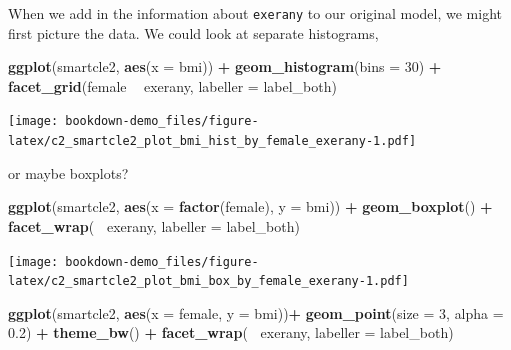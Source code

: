 \documentclass[]{book}
\newenvironment{Shaded}{\begin{snugshade}}{\end{snugshade}}
\newcommand{\KeywordTok}[1]{\textcolor[rgb]{0.13,0.29,0.53}{\textbf{#1}}}
\newcommand{\DataTypeTok}[1]{\textcolor[rgb]{0.13,0.29,0.53}{#1}}
\newcommand{\DecValTok}[1]{\textcolor[rgb]{0.00,0.00,0.81}{#1}}
\newcommand{\FloatTok}[1]{\textcolor[rgb]{0.00,0.00,0.81}{#1}}
\newcommand{\StringTok}[1]{\textcolor[rgb]{0.31,0.60,0.02}{#1}}
\newcommand{\OperatorTok}[1]{\textcolor[rgb]{0.81,0.36,0.00}{\textbf{#1}}}
\newcommand{\NormalTok}[1]{#1}
\theoremstyle{definition}
\theoremstyle{definition}
\theoremstyle{definition}
\theoremstyle{remark}
\begin{document}
When we add in the information about \texttt{exerany} to our original
model, we might first picture the data. We could look at separate
histograms,

\begin{Shaded}
\begin{Highlighting}[]
\KeywordTok{ggplot}\NormalTok{(smartcle2, }\KeywordTok{aes}\NormalTok{(}\DataTypeTok{x =}\NormalTok{ bmi)) }\OperatorTok{+}
\StringTok{    }\KeywordTok{geom_histogram}\NormalTok{(}\DataTypeTok{bins =} \DecValTok{30}\NormalTok{) }\OperatorTok{+}
\StringTok{    }\KeywordTok{facet_grid}\NormalTok{(female }\OperatorTok{~}\StringTok{ }\NormalTok{exerany, }\DataTypeTok{labeller =}\NormalTok{ label_both)}
\end{Highlighting}
\end{Shaded}

\texttt{[image: bookdown-demo\_files/figure-latex/c2\_smartcle2\_plot\_bmi\_hist\_by\_female\_exerany-1.pdf]}

or maybe boxplots?

\begin{Shaded}
\begin{Highlighting}[]
\KeywordTok{ggplot}\NormalTok{(smartcle2, }\KeywordTok{aes}\NormalTok{(}\DataTypeTok{x =} \KeywordTok{factor}\NormalTok{(female), }\DataTypeTok{y =}\NormalTok{ bmi)) }\OperatorTok{+}
\StringTok{    }\KeywordTok{geom_boxplot}\NormalTok{() }\OperatorTok{+}
\StringTok{    }\KeywordTok{facet_wrap}\NormalTok{(}\OperatorTok{~}\StringTok{ }\NormalTok{exerany, }\DataTypeTok{labeller =}\NormalTok{ label_both)}
\end{Highlighting}
\end{Shaded}

\texttt{[image: bookdown-demo\_files/figure-latex/c2\_smartcle2\_plot\_bmi\_box\_by\_female\_exerany-1.pdf]}

\begin{Shaded}
\begin{Highlighting}[]
\KeywordTok{ggplot}\NormalTok{(smartcle2, }\KeywordTok{aes}\NormalTok{(}\DataTypeTok{x =}\NormalTok{ female, }\DataTypeTok{y =}\NormalTok{ bmi))}\OperatorTok{+}
\StringTok{    }\KeywordTok{geom_point}\NormalTok{(}\DataTypeTok{size =} \DecValTok{3}\NormalTok{, }\DataTypeTok{alpha =} \FloatTok{0.2}\NormalTok{) }\OperatorTok{+}
\StringTok{    }\KeywordTok{theme_bw}\NormalTok{() }\OperatorTok{+}
\StringTok{    }\KeywordTok{facet_wrap}\NormalTok{(}\OperatorTok{~}\StringTok{ }\NormalTok{exerany, }\DataTypeTok{labeller =}\NormalTok{ label_both)}
\end{Highlighting}
\end{Shaded}
\end{document}
